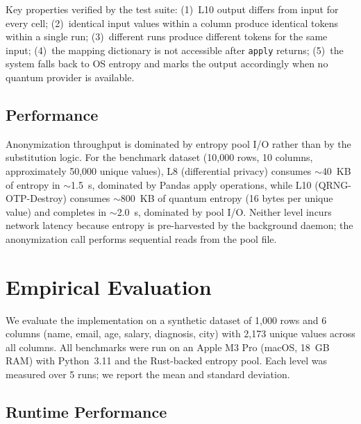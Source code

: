 \documentclass[journal]{IEEEtran}
\begin{document}
Key properties verified by the test suite: (1)~L10 output differs from input for every cell; (2)~identical input values within a column produce identical tokens within a single run; (3)~different runs produce different tokens for the same input; (4)~the mapping dictionary is not accessible after \texttt{apply} returns; (5)~the system falls back to OS entropy and marks the output accordingly when no quantum provider is available.

\subsection{Performance}
\label{subsec:perf}

Anonymization throughput is dominated by entropy pool I/O rather than by the substitution logic. For the benchmark dataset (10,000 rows, 10 columns, approximately 50,000 unique values), L8 (differential privacy) consumes ${\sim}$40~KB of entropy in ${\sim}$1.5~s, dominated by Pandas apply operations, while L10 (QRNG-OTP-Destroy) consumes ${\sim}$800~KB of quantum entropy (16 bytes per unique value) and completes in ${\sim}$2.0~s, dominated by pool I/O. Neither level incurs network latency because entropy is pre-harvested by the background daemon; the anonymization call performs sequential reads from the pool file.

\section{Empirical Evaluation}
\label{sec:evaluation}

We evaluate the implementation on a synthetic dataset of 1,000 rows and 6 columns (name, email, age, salary, diagnosis, city) with 2,173 unique values across all columns. All benchmarks were run on an Apple M3 Pro (macOS, 18~GB RAM) with Python~3.11 and the Rust-backed entropy pool. Each level was measured over 5 runs; we report the mean and standard deviation.

\subsection{Runtime Performance}
\end{document}
